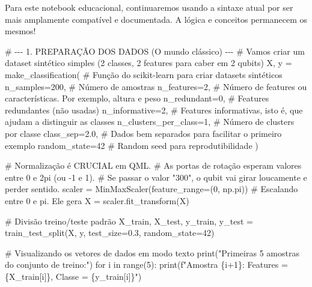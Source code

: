 \documentclass[
  brazilian,
]{report}
\newenvironment{Shaded}{\begin{snugshade}}{\end{snugshade}}
\newcommand{\NormalTok}[1]{\textcolor[rgb]{0.00,0.23,0.31}{#1}}
\begin{document}
Para este notebook educacional, continuaremos usando a sintaxe atual por
ser mais amplamente compatível e documentada. A lógica e conceitos
permanecem os mesmos!

\begin{Shaded}
\begin{Highlighting}[]


\NormalTok{\# {-}{-}{-} 1. PREPARAÇÃO DOS DADOS (O mundo clássico) {-}{-}{-}}
\NormalTok{\# Vamos criar um dataset sintético simples (2 classes, 2 features para caber em 2 qubits)}
\NormalTok{X, y = make\_classification(         \# Função do scikit{-}learn para criar datasets sintéticos}
\NormalTok{    n\_samples=200,                  \# Número de amostras}
\NormalTok{    n\_features=2,                   \# Número de features ou características. Por exemplo, altura e peso}
\NormalTok{    n\_redundant=0,                  \# Features redundantes (não usadas)}
\NormalTok{    n\_informative=2,                \# Features informativas, isto é, que ajudam a distinguir as classes}
\NormalTok{    n\_clusters\_per\_class=1,         \# Número de clusters por classe}
\NormalTok{    class\_sep=2.0,                  \# Dados bem separados para facilitar o primeiro exemplo}
\NormalTok{    random\_state=42                 \# Random seed para reprodutibilidade}
\NormalTok{)}

\NormalTok{\# Normalização é CRUCIAL em QML.}
\NormalTok{\# As portas de rotação esperam valores entre 0 e 2pi (ou {-}1 e 1).}
\NormalTok{\# Se passar o valor "300", o qubit vai girar loucamente e perder sentido.}
\NormalTok{scaler = MinMaxScaler(feature\_range=(0, np.pi)) \# Escalando entre 0 e pi. Ele gera }
\NormalTok{X = scaler.fit\_transform(X)}

\NormalTok{\# Divisão treino/teste padrão}
\NormalTok{X\_train, X\_test, y\_train, y\_test = train\_test\_split(X, y, test\_size=0.3, random\_state=42)}
\end{Highlighting}
\end{Shaded}

\begin{Shaded}
\begin{Highlighting}[]

\NormalTok{\# Visualizando os vetores de dados em modo texto}
\NormalTok{print("Primeiras 5 amostras do conjunto de treino:")}
\NormalTok{for i in range(5):}
\NormalTok{    print(f"Amostra \{i+1\}: Features = \{X\_train[i]\}, Classe = \{y\_train[i]\}")}
\end{Highlighting}
\end{Shaded}
\end{document}
